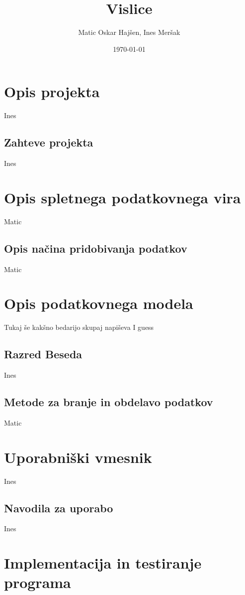 \documentclass [a4paper, 12pt] {article}
\title {Vislice}
\author {Matic Oskar Hajšen, Ines Meršak}
\date {\today}
\begin{document}
\maketitle
\tableofcontents

\newpage

\section {Opis projekta}
Ines
\subsection {Zahteve projekta}
Ines

\section {Opis spletnega podatkovnega vira}
Matic
\subsection {Opis načina pridobivanja podatkov}
Matic

\section {Opis podatkovnega modela}
Tukaj še kakšno bedarijo skupaj napiševa I guess
\subsection {Razred Beseda}
Ines
\subsection {Metode za branje in obdelavo podatkov}
Matic

\section {Uporabniški vmesnik}
Ines
\subsection {Navodila za uporabo}
Ines

\section {Implementacija in testiranje programa}
\end{document}
